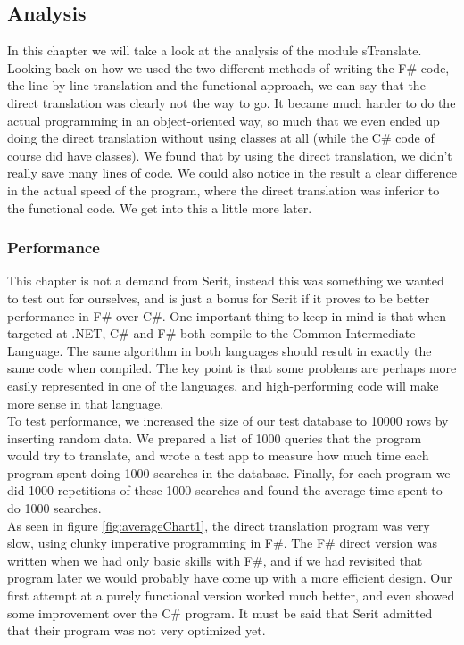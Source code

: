 \documentclass[12pt, a4paper]{article}
\begin{document}
\newpage


\subsection{Analysis}
In this chapter we will take a look at the analysis of the module sTranslate.
Looking back on how we used the two different methods of writing the F\# code, the line by line translation and the functional approach, we can say that the direct translation was clearly not the way to go. It became much harder to do the actual programming in an object-oriented way, so much that we even ended up doing the direct translation without using classes at all (while the C\# code of course did have classes). We found that by using the direct translation, we didn't really save many lines of code. We could also notice in the result a clear difference in the actual speed of the program, where the direct translation was inferior to the functional code. We get into this a little more later.

\subsubsection{Performance}
This chapter is not a demand from Serit, instead this was something we wanted to test out for ourselves, and is just a bonus for Serit if it proves to be better performance in F\# over C\#. One important thing to keep in mind is that when targeted at .NET, C\# and F\# both compile to the Common Intermediate Language. The same algorithm in both languages should result in exactly the same code when compiled. The key point is that some problems are perhaps more easily represented in one of the languages, and high-performing code will make more sense in that language.\\

To test performance, we increased the size of our test database to 10000 rows by inserting random data. We prepared a list of 1000 queries that the program would try to translate, and wrote a test app to measure how much time each program spent doing 1000 searches in the database. Finally, for each program we did 1000 repetitions of these 1000 searches and found the average time spent to do 1000 searches.\\

As seen in figure \ref{fig:averageChart1}, the direct translation program was very slow, using clunky imperative programming in F\#. The F\# direct version was written when we had only basic skills with F\#, and if we had revisited that program later we would probably have come up with a more efficient design. Our first attempt at a purely functional version worked much better, and even showed some improvement over the C\# program. It must be said that Serit admitted that their program was not very optimized yet.\\
\end{document}
